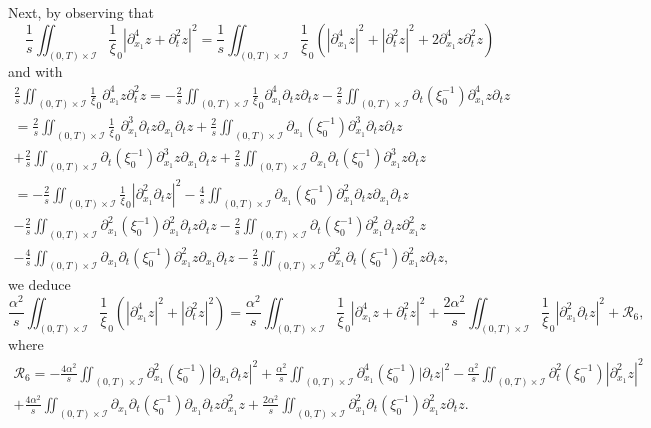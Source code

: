 \documentclass[a4paper, 12pt]{article}
\theoremstyle{plain}
\theoremstyle{definition}
\numberwithin{theorem}{section}
\numberwithin{equation}{section}
\begin{document}
{Next, by observing that
$$
\frac1s\iint_{(0,T)\times\mathcal{I}}\frac1\xi_0|\partial^4_{x_1}z+\partial^2_tz|^2=\frac1s\iint_{(0,T)\times\mathcal{I}}\frac1\xi_0(|\partial^4_{x_1}z|^2+|\partial^2_tz|^2+2\partial^4_{x_1}z\partial^2_tz)
$$
and with 
\begin{multline*}
\frac2s\iint_{(0,T)\times\mathcal{I}}\frac1\xi_0\partial^4_{x_1}z\partial^2_tz=-\frac2s\iint_{(0,T)\times\mathcal{I}}\frac1\xi_0\partial^4_{x_1}\partial_tz\partial_tz-\frac2s\iint_{(0,T)\times\mathcal{I}}\partial_t(\xi_0^{-1})\partial^4_{x_1}z\partial_tz \\
=\frac2s\iint_{(0,T)\times\mathcal{I}}\frac1\xi_0\partial^3_{x_1}\partial_tz\partial_ {x_1}\partial_tz+\frac2s\iint_{(0,T)\times\mathcal{I}}\partial_{x_1}(\xi_0^{-1})\partial^3_{x_1}\partial_tz\partial_tz\\
+\frac2s\iint_{(0,T)\times\mathcal{I}}\partial_t(\xi_0^{-1})\partial^3_{x_1}z \partial_{x_1} \partial_tz+\frac2s\iint_{(0,T)\times\mathcal{I}}\partial_{x_1}\partial_t(\xi_0^{-1})\partial^3_{x_1}z\partial_tz \\
=-\frac2s\iint_{(0,T)\times\mathcal{I}}\frac1\xi_0|\partial^2_{x_1}\partial_tz|^2-\frac4s\iint_{(0,T)\times\mathcal{I}}\partial_{x_1}(\xi_0^{-1})\partial^2_{x_1}\partial_tz\partial_ {x_1}\partial_tz\\
-\frac2s\iint_{(0,T)\times\mathcal{I}}\partial_{x_1}^2(\xi_0^{-1})\partial_{x_1}^2\partial_tz\partial_tz
-\frac2s\iint_{(0,T)\times\mathcal{I}}\partial_t(\xi_0^{-1})\partial^2_{x_1}\partial_tz \partial_{x_1}^2z\\
-\frac4s\iint_{(0,T)\times\mathcal{I}}\partial_{x_1}\partial_t(\xi_0^{-1})\partial^2_{x_1}z \partial_{x_1}\partial_tz 
-\frac2s\iint_{(0,T)\times\mathcal{I}}\partial^2_{x_1}\partial_t(\xi_0^{-1})\partial^2_{x_1}z \partial_tz,
\end{multline*}
we deduce
\begin{equation}\label{EqR6}
\frac{\alpha^2}{s}\iint_{(0,T)\times\mathcal{I}}\frac1\xi_0(|\partial^4_{x_1}z|^2+|\partial^2_tz|^2)=\frac{\alpha^2}{s}\iint_{(0,T)\times\mathcal{I}}\frac1\xi_0|\partial^4_{x_1}z+\partial^2_tz|^2+\frac{2\alpha^2}{s}\iint_{(0,T)\times\mathcal{I}}\frac1\xi_0|\partial^2_{x_1}\partial_tz|^2+\mathcal{R}_6,
\end{equation}
where
\begin{multline*}
    \mathcal{R}_6=-\frac{4\alpha^2}{s}\iint_{(0,T)\times\mathcal{I}}\partial_{x_1}^2(\xi_0^{-1})|\partial_{x_1}\partial_tz|^2
+\frac{\alpha^2}{s}\iint_{(0,T)\times\mathcal{I}}\partial_{x_1}^4(\xi_0^{-1})|\partial_tz|^2-\frac{\alpha^2}{s}\iint_{(0,T)\times\mathcal{I}}\partial_t^2(\xi_0^{-1})|\partial^2_{x_1}z|^2\\
+\frac{4\alpha^2}{s}\iint_{(0,T)\times\mathcal{I}}\partial_{x_1}\partial_t(\xi_0^{-1})\partial_{x_1}\partial_tz \partial_{x_1}^2z + \frac{2\alpha^2}{s}\iint_{(0,T)\times\mathcal{I}}\partial^2_{x_1}\partial_t(\xi_0^{-1})\partial^2_{x_1}z \partial_tz.
\end{multline*}

}
\end{document}
